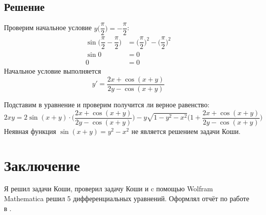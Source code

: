 \documentclass[a4paper, 14pt, titlepage, fleqn]{extarticle}
\begin{document}
		\subsection*{Решение}
			Проверим начальное условие \( y\bigg(\dfrac{\pi}{2}\bigg) = -\dfrac{\pi}{2} \):
			\begin{align*}
				\sin{\bigg(\dfrac{\pi}{2} - \dfrac{\pi}{2}\bigg)}&= \bigg(\dfrac{\pi}{2}\bigg)^2 - \bigg(\dfrac{\pi}{2}\bigg)^2 \\
				\sin{0}&= 0 \\
				0 &= 0
			\end{align*}
			\noindent Начальное условие выполняется
			\[y' = \dfrac{2x+\cos{(x+y)}}{2y-\cos{(x+y)}}\]

			\noindent Подставим в уравнение и проверим получится ли верное равенство:
			\[2xy = 2\sin{(x+y)} \cdot \bigg ( \dfrac{2x+\cos{(x+y)}}{2y-\cos{(x+y)}} \bigg) - y\sqrt{1-y^2-x^2}\bigg (1+ \dfrac{2x+\cos{(x+y)}}{2y-\cos{(x+y)}} \bigg) \]
			Неявная функция \(  \sin{(x+y)} = y^2-x^2 \) не является решением задачи Коши.

	\section*{Заключение}
		\noindent Я решил задачи Коши, проверил задачу Коши и c помощью Wolfram Mathematica решил 5 дифференциальных уравнений. Оформлял отчёт по работе  в .
\end{document}
